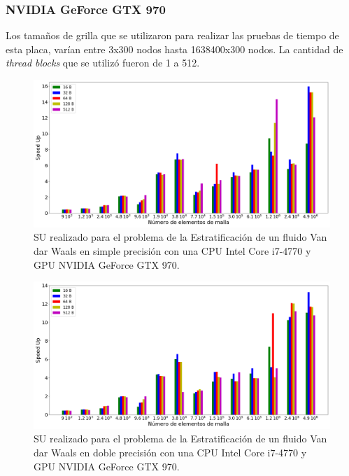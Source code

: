 \newpage

\subsubsection{NVIDIA GeForce GTX 970}

Los tamaños de grilla que se utilizaron para realizar las pruebas de tiempo de esta placa, varían entre 3x300 nodos hasta 1638400x300 nodos. La cantidad de \textit{thread blocks} que se utilizó fueron de 1 a 512.


\begin{figure}[h!]
	\centering
	\includegraphics[width=\textwidth]{figs_2/cap4/s_970_VdW_simple_10}
	\caption{SU realizado para el problema de la Estratificación de un fluido Van dar Waals en simple precisión con una CPU Intel Core i7-4770 y GPU NVIDIA GeForce GTX 970.} 
	\label{fig:s_970_VdW_simple_10}	
\end{figure}

\begin{figure}[h!]
	\centering
	\includegraphics[width=\textwidth]{figs_2/cap4/s_970_VdW_double_10}
	\caption{SU realizado para el problema de la Estratificación de un fluido Van dar Waals en doble precisión con una CPU Intel Core i7-4770 y GPU NVIDIA GeForce GTX 970.} 
	\label{fig:s_970_VdW_double_10}	
\end{figure}

